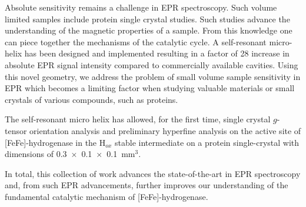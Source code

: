 Absolute sensitivity remains a challenge in EPR spectroscopy. Such volume limited samples include protein single crystal studies. Such studies advance the  understanding of the magnetic properties of a sample. From this knowledge one can piece together the mechanisms of the catalytic cycle. A self-resonant micro-helix has been designed and implemented resulting in a factor of 28 increase in absolute EPR signal intensity compared to commercially available cavities. Using this novel geometry, we address the problem of small volume sample sensitivity in EPR which becomes a limiting factor when studying valuable materials or small crystals of various compounds, such as proteins. 

The self-resonant micro helix has allowed, for the first time, single crystal $g$-tensor orientation analysis and preliminary hyperfine analysis on the active site of [FeFe]-hydrogenase in the H$_{ox}$ stable intermediate on a protein single-crystal with dimensions of 0.3~$\times$~0.1~$\times$~0.1~mm$^3$. 

In total, this collection of work advances the state-of-the-art in EPR spectroscopy and, from such EPR advancements, further improves our understanding of the fundamental catalytic mechanism of [FeFe]-hydrogenase. 


{\renewcommand{\bibsection}{\clearpage\section*{\bibname}\markboth{\bibname}{\bibname}}
\renewcommand{\bibname}{CHAPTER 1. REFERENCES}


}